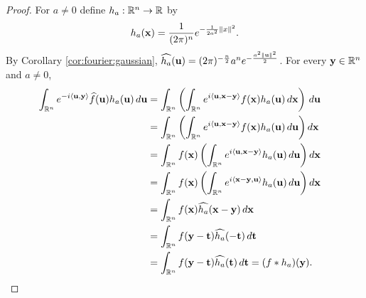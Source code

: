 \begin{proof}
For $a \neq 0$ define $h_a : {\mathbb R}^n \to {\mathbb R}$ by \begin{align*}
    h_a (\mathbf{x}) = \frac{1}{(2 \pi)^n} e^{-\frac{1}{2a^2} \left\lVert x\right\rVert^2}.
\end{align*}
By Corollary \ref{cor:fourier:gaussian}, $\widehat{h_a} (\mathbf{u}) = (2 \pi)^{-\frac{n}{2}} a^{n} e^{-\frac{a^2 \left\lVert\mathbf{u}\right\rVert^2}{2} }$. For every $\mathbf{y} \in {\mathbb R}^n$ and $a \neq 0$, \begin{align*}
 \int_{{\mathbb R}^n}  e^{-i \langle \mathbf{u}, \mathbf{y}\rangle} \widehat{f}(\mathbf{u})  h_a(\mathbf{u}) \,d\mathbf{u} &=  \int_{{\mathbb R}^n} \left( \int_{{\mathbb R}^n}   e^{i \langle \mathbf{u}, \mathbf{x} - \mathbf{y} \rangle} f(\mathbf{x}) h_a(\mathbf{u})  \,d\mathbf{x} \right) \,d\mathbf{u}  & \\
                      &= \int_{{\mathbb R}^n} \left( \int_{{\mathbb R}^n}  e^{i \langle \mathbf{u}, \mathbf{x} - \mathbf{y} \rangle} f(\mathbf{x}) h_a(\mathbf{u})  \,d\mathbf{u} \right)d\mathbf{x} & \\
                      &= \int_{{\mathbb R}^n} f(\mathbf{x}) \left( \int_{{\mathbb R}^n}   e^{i \langle \mathbf{u}, \mathbf{x} - \mathbf{y} \rangle} h_a(\mathbf{u})  \,d\mathbf{u} \right)d\mathbf{x} & \\
                      &= \int_{{\mathbb R}^n} f(\mathbf{x}) \left( \int_{{\mathbb R}^n}   e^{i \langle \mathbf{x} - \mathbf{y} , \mathbf{u} \rangle} h_a(\mathbf{u})  \,d\mathbf{u} \right)d\mathbf{x}  & \\
                      &= \int_{{\mathbb R}^n} f(\mathbf{x}) \widehat{h_a}(\mathbf{x} - \mathbf{y}) \,d\mathbf{x} & \\
                      &= \int_{{\mathbb R}^n} f(\mathbf{y} - \mathbf{t}) \widehat{h_a}(- \mathbf{t}) \,d\mathbf{t} &\\ 
                      &=\int_{{\mathbb R}^n} f(\mathbf{y} - \mathbf{t}) \widehat{h_a}(\mathbf{t}) \,d\mathbf{t} = (f \ast h_a)(\mathbf{y}).
\end{align*}


\end{proof}
